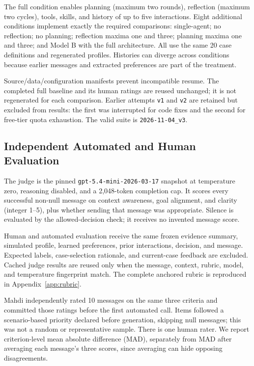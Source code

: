 \documentclass{article}
\begin{document}
The full condition enables planning (maximum two rounds), reflection (maximum two cycles), tools, skills, and history of up to five interactions. Eight additional conditions implement exactly the required comparisons: single-agent; no reflection; no planning; reflection maxima one and three; planning maxima one and three; and Model B with the full architecture. All use the same 20 case definitions and regenerated profiles. Histories can diverge across conditions because earlier messages and extracted preferences are part of the treatment.

Source/data/configuration manifests prevent incompatible resume. The completed full baseline and its human ratings are reused unchanged; it is not regenerated for each comparison. Earlier attempts \texttt{v1} and \texttt{v2} are retained but excluded from results: the first was interrupted for code fixes and the second for free-tier quota exhaustion. The valid suite is \texttt{2026-11-04\_v3}.

\subsection{Independent Automated and Human Evaluation}
The judge is the pinned \texttt{gpt-5.4-mini-2026-03-17} snapshot at temperature zero, reasoning disabled, and a 2,048-token completion cap. It scores every successful non-null message on context awareness, goal alignment, and clarity (integer 1--5), plus whether sending that message was appropriate. Silence is evaluated by the allowed-decision check; it receives no invented message score.

Human and automated evaluation receive the same frozen evidence summary, simulated profile, learned preferences, prior interactions, decision, and message. Expected labels, case-selection rationale, and current-case feedback are excluded. Cached judge results are reused only when the message, context, rubric, model, and temperature fingerprint match. The complete anchored rubric is reproduced in Appendix~\ref{app:rubric}.

Mahdi independently rated 10 messages on the same three criteria and committed those ratings before the first automated call. Items followed a scenario-based priority declared before generation, skipping null messages; this was not a random or representative sample. There is one human rater. We report criterion-level mean absolute difference (MAD), separately from MAD after averaging each message's three scores, since averaging can hide opposing disagreements.
\end{document}

